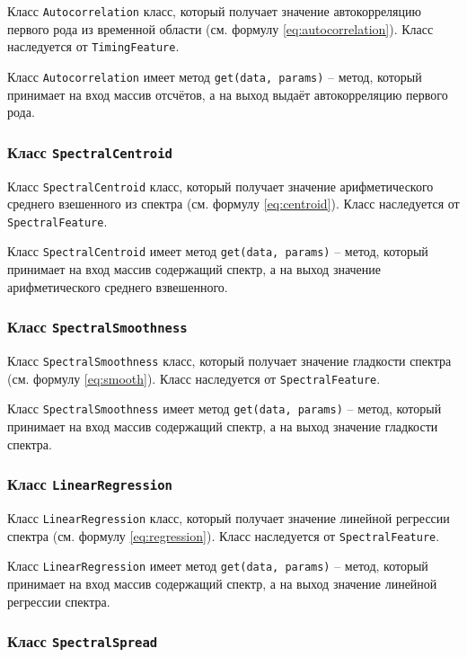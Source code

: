 Класс \texttt{Autocorrelation} класс, который получает значение автокорреляцию первого рода из временной области (см. формулу \ref{eq:autocorrelation}). Класс наследуется от \texttt{TimingFeature}.

Класс \texttt{Autocorrelation} имеет  метод \texttt{get(data, params)} --  метод, который принимает на вход массив отсчётов, а на выход выдаёт автокорреляцию первого рода. 

\subsubsection{Класс \texttt{SpectralCentroid}}

Класс \texttt{SpectralCentroid} класс, который получает значение арифметического среднего взешенного из спектра (см. формулу \ref{eq:centroid}). Класс наследуется от \texttt{SpectralFeature}.

Класс \texttt{SpectralCentroid} имеет метод \texttt{get(data, params)} --  метод, который принимает на вход массив содержащий спектр, а на выход  значение арифметического среднего взвешенного. 

\subsubsection{Класс \texttt{SpectralSmoothness}}

Класс \texttt{SpectralSmoothness} класс, который получает значение гладкости спектра (см. формулу \ref{eq:smooth}). Класс наследуется от \texttt{SpectralFeature}.

Класс \texttt{SpectralSmoothness} имеет метод \texttt{get(data, params)} --  метод, который принимает на вход массив содержащий спектр, а на выход значение гладкости спектра.

\subsubsection{Класс \texttt{LinearRegression}}

Класс \texttt{LinearRegression} класс, который получает значение линейной регрессии спектра  (см. формулу \ref{eq:regression}). Класс наследуется от \texttt{SpectralFeature}.

Класс \texttt{LinearRegression} имеет метод \texttt{get(data, params)} --  метод, который принимает на вход массив содержащий спектр, а на выход  значение линейной регрессии спектра.

\subsubsection{Класс \texttt{SpectralSpread}}

